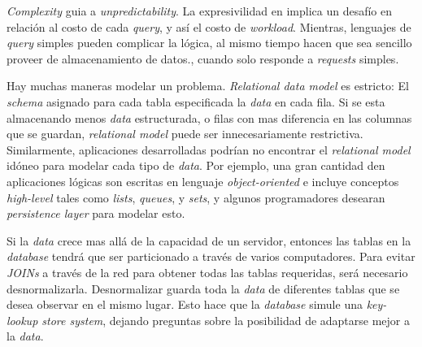 \textit{Complexity} guia a \textit{unpredictability}. La expresivilidad en  implica un desafío en relación al costo de cada \textit{query}, y así el costo de \textit{workload}. Mientras, lenguajes de \textit{query} simples pueden complicar la lógica, al mismo tiempo hacen que sea sencillo proveer de almacenamiento de datos., cuando solo responde a \textit{requests} simples.

Hay muchas maneras modelar un problema. \textit{Relational data model} es estricto: El \textit{schema} asignado para cada tabla especificada la \textit{data} en cada fila. Si se esta almacenando menos \textit{data} estructurada, o filas con mas diferencia en las columnas que se guardan, \textit{relational model} puede ser innecesariamente restrictiva. Similarmente, aplicaciones desarrolladas podrían no encontrar el \textit{relational model} idóneo para modelar cada tipo de \textit{data}. Por ejemplo, una gran cantidad den aplicaciones lógicas son escritas en lenguaje \textit{object-oriented} e incluye conceptos \textit{high-level} tales como \textit{lists}, \textit{queues}, y \textit{sets}, y algunos programadores desearan \textit{persistence layer} para modelar esto.

Si la \textit{data} crece mas allá de la capacidad de un servidor, entonces las tablas en la \textit{database} tendrá que ser particionado a través de varios computadores. Para evitar \textit{JOINs} a través de la red para obtener todas las tablas requeridas, será necesario desnormalizarla. Desnormalizar guarda toda la \textit{data} de diferentes tablas que se desea observar en el mismo lugar. Esto hace que la \textit{database} simule una \textit{key-lookup store system}, dejando preguntas sobre la posibilidad de adaptarse mejor a la \textit{data}.

